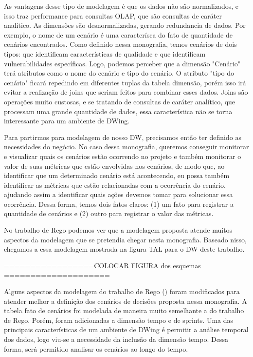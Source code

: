 As vantagens desse tipo de modelagem é que os dados não são normalizados, e isso traz performance para consultas OLAP, que são consultas de caráter analítico. As dimensões são desnormalizadas, gerando redundancia de dados. Por exemplo, o nome de um cenário é uma caracterísca do fato de quantidade de cenários encontrados. Como definido nessa monografia, temos cenários de dois tipos: que identificam características de qualidade e que identificam vulnerabilidades específicas. Logo, podemos perceber que a dimensão "Cenário" terá atributos como o nome do cenário e tipo do cenário. O atributo "tipo do cenário" ficará repedindo em diferentes tuplas da tabela dimensão, porém isso irá evitar a realização de joins que seriam feitos para combinar esses dados. Joins são operações muito custosas, e se tratando de consultas de caráter analítico, que processam uma grande quantidade de dados, essa característica não se torna interessante para um ambiente de DWing.


Para partirmos para modelagem de nosso DW,  precisamos então ter definido as necessidades do negócio. No caso dessa monografia, queremos conseguir monitorar e visualizar quais os cenários estão ocorrendo no projeto e também monitorar o valor de suas métricas que estão envolvidas nos cenários, de modo que, ao identificar que um determinado cenário está acontecendo, eu possa também identificar as métricas que estão relacionadas com a ocorrência do cenário, ajudando assim a identificar quais ações devemos tomar para solucionar essa ocorrência. Dessa forma, temos dois fatos claros: (1) um fato para registrar a quantidade de cenários e (2) outro para registrar o valor das métricas.

No trabalho de Rego \citeyear{rego2014} podemos ver que a modelagem proposta atende muitos aspectos da modelagem que se pretendia chegar nesta monografia. Baseado nisso, chegamos a essa modelagem mostrada na figura TAL para o DW deste trabalho.

=================COLOCAR FIGURA dos esquemas ====================


Alguns aspectos da modelagem do trabalho de Rego (\citeyear{rego2014}) foram modificados para atender melhor a definição dos cenários de decisões proposta nessa monografia. A tabela fato de cenários foi modelada de maneira muito semelhante a do trabalho de Rego. Porém, foram adicionadas a dimensão tempo e de sprints. Uma das principais características de um ambiente de DWing é permitir a análise temporal dos dados, logo viu-se a necessidade da inclusão da dimensão tempo. Dessa forma, será permitido analisar os cenários ao longo do tempo. 

